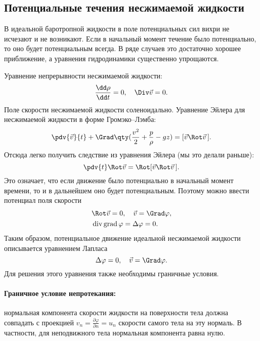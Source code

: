 \newpage
\subsection{Потенциальные течения несжимаемой жидкости}

В идеальной баротропной жидкости в поле потенциальных сил вихри не исчезают и не возникают. Если в начальный момент течение было потенциально, то оно будет потенциальным всегда. В ряде случаев это достаточно хорошее приближение, а уравнения гидродинамики существенно упрощаются.

Уравнение непрерывности несжимаемой жидкости:
\begin{equation}
\frac { \dd \rho } { \dd t } = 0 ,\quad \Div \vec{v} = 0.
\end{equation}
Поле скорости несжимаемой жидкости соленоидально. Уравнение Эйлера для несжимаемой жидкости в форме Громэко--Лэмба:
\begin{equation}
\pdv{\vec{v}}{t} + \Grad\qty(\frac{v^2}{2}+\frac{p}{\rho}-gz) = [\vec{v} \Rot\vec{v}\,].
\end{equation}
Отсюда легко получить следствие из уравнения Эйлера (мы это делали раньше):
\begin{equation}
\pdv{t}\Rot\vec{v} =\Rot[ \vec{v}\Rot\vec{v}  \, ].
\end{equation}
Это означает, что если движение было потенциально в начальный момент времени, то и в дальнейшем оно будет потенциальным. Поэтому можно ввести потенциал поля скорости
\begin{equation}
	\begin{aligned}
	 &\Rot \vec{v} = 0 , \quad  { \vec{v} =\Grad \varphi }, \\
	 &\operatorname { div\, grad } \varphi = \Delta \varphi = 0.
	\end{aligned}
\end{equation}
Таким образом, потенциальное движение идеальной несжимаемой жидкости описывается уравнением Лапласа
\begin{equation}
\Delta \varphi = 0 , \quad \vec{v} =\Grad \varphi.
\end{equation}
Для решения этого уравнения также необходимы граничные условия.

\paragraph{Граничное условие непротекания:}\hspace{-1em} нормальная компонента скорости жидкости на поверхности тела должна совпадать с проекцией $v_n=\frac { \partial \varphi } { \partial n }=u_n$ скорости самого тела на эту нормаль.  В частности, для неподвижного тела нормальная компонента равна нулю.

